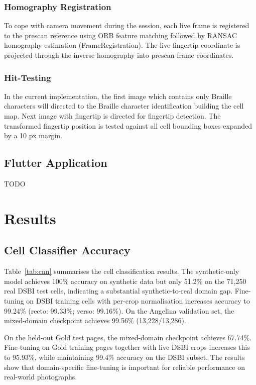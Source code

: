 \documentclass{article}
\begin{document}
\subsubsection{Homography Registration}
To cope with camera movement during the session, each live frame is registered to the prescan reference using ORB feature matching followed by RANSAC homography estimation (FrameRegistration). The live fingertip coordinate is projected through the inverse homography into prescan-frame coordinates.


\subsubsection{Hit-Testing}
In the current implementation, the first image which contains only Braille characters will directed to the Braille character identification building the cell map. Next image with fingertip is directed for fingertip detection. The transformed fingertip position is tested against all cell bounding boxes expanded by a 10 px margin.

\subsection{Flutter Application}
TODO


\section{Results}


\subsection*{Cell Classifier Accuracy}

Table~\ref{tab:cnn} summarises the cell classification results. The synthetic-only model achieves 100\% accuracy on synthetic data but only 51.2\% on the 71{,}250 real DSBI test cells, indicating a substantial synthetic-to-real domain gap. Fine-tuning on DSBI training cells with per-crop normalisation increases accuracy to 99.24\% (recto: 99.33\%; verso: 99.16\%). On the Angelina validation set, the mixed-domain checkpoint achieves 99.56\% (13{,}228/13{,}286).

On the held-out Gold test pages, the mixed-domain checkpoint achieves 67.74\%. Fine-tuning on Gold training pages together with live DSBI crops increases this to 95.93\%, while maintaining 99.4\% accuracy on the DSBI subset. The results show that domain-specific fine-tuning is important for reliable performance on real-world photographs.
\end{document}
